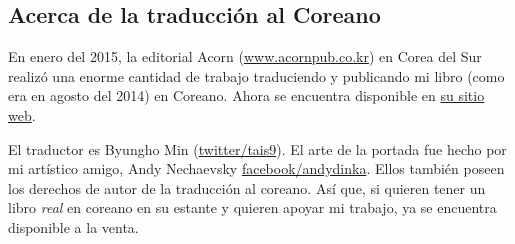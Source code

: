 



\subsection*{Acerca de la traducci\'on al Coreano}

En enero del 2015, la editorial Acorn (\href{http://www.acornpub.co.kr}{www.acornpub.co.kr}) en Corea del Sur realiz\'o una enorme cantidad de trabajo
traduciendo y publicando mi libro (como era en agosto del 2014) en Coreano.
Ahora se encuentra disponible en
\href{http://go.yurichev.com/17343}{su sitio web}.

El traductor es Byungho Min (\href{http://go.yurichev.com/17344}{twitter/tais9}).
El arte de la portada fue hecho por mi art\'istico amigo, Andy Nechaevsky
\href{http://go.yurichev.com/17023}{facebook/andydinka}.
Ellos tambi\'en poseen los derechos de autor de la traducci\'on al coreano.
As\'i que, si quieren tener un libro \emph{real} en coreano en su estante
y quieren apoyar mi trabajo, ya se encuentra disponible a la venta.


